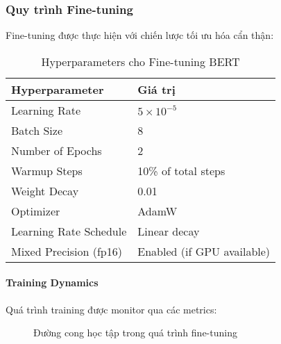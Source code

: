 \subsubsection{Quy trình Fine-tuning}

Fine-tuning được thực hiện với chiến lược tối ưu hóa cẩn thận:

\begin{table}[H]
\centering
\caption{Hyperparameters cho Fine-tuning BERT}
\label{tab:finetuning_params}
\begin{tabular}{ll}
\toprule
\textbf{Hyperparameter} & \textbf{Giá trị} \\
\midrule
Learning Rate & $5 \times 10^{-5}$ \\
Batch Size & 8 \\
Number of Epochs & 2 \\
Warmup Steps & 10\% of total steps \\
Weight Decay & 0.01 \\
Optimizer & AdamW \\
Learning Rate Schedule & Linear decay \\
Mixed Precision (fp16) & Enabled (if GPU available) \\
\bottomrule
\end{tabular}
\end{table}

\paragraph{Training Dynamics}
Quá trình training được monitor qua các metrics:

\begin{figure}[H]
\centering
{}
\caption{Đường cong học tập trong quá trình fine-tuning}
\label{fig:training_curves}
\end{figure}

